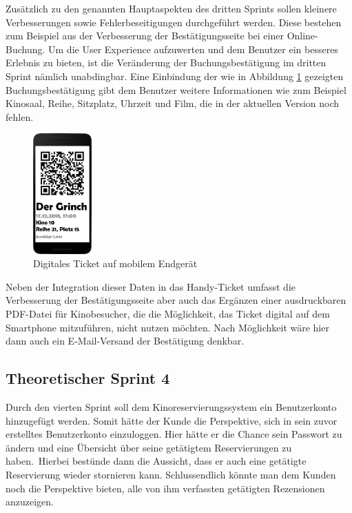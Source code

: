 Zusätzlich zu den genannten Hauptaspekten des dritten Sprints sollen kleinere Verbesserungen sowie Fehlerbeseitigungen durchgeführt werden.
Diese bestehen zum Beispiel aus der Verbesserung der Bestätigungsseite bei einer Online-Buchung.
Um die User Experience aufzuwerten und dem Benutzer ein besseres Erlebnis zu bieten, ist die Veränderung der Buchungsbestätigung im dritten Sprint nämlich unabdingbar.
Eine Einbindung der wie in Abbildung \ref{fig:ticket_phone} gezeigten Buchungsbestätigung gibt dem Benutzer weitere Informationen wie zum Beispiel Kinosaal, Reihe, Sitzplatz, Uhrzeit und Film, die in der aktuellen Version noch fehlen.

\begin{figure}[ht]
	\centering
	\includegraphics[width=0.2\textwidth]{img/ticket_phone}
	\captionsetup{format=hang}
	\caption{Digitales Ticket auf mobilem Endgerät}
	\label{fig:ticket_phone}
\end{figure}

Neben der Integration dieser Daten in das Handy-Ticket umfasst die Verbesserung der Bestätigungsseite aber auch das Ergänzen einer ausdruckbaren PDF-Datei für Kinobesucher, die die Möglichkeit, das Ticket digital auf dem Smartphone mitzuführen, nicht nutzen möchten.
Nach Möglichkeit wäre hier dann auch ein E-Mail-Versand der Bestätigung denkbar.

\subsection{Theoretischer Sprint 4}
\label{ssssec:sprint_benuterkonto}
\authorsection{\authorSG}
Durch den vierten Sprint soll dem Kinoreservierungssystem ein Benutzerkonto hinzugefügt werden.
Somit hätte der Kunde die Perspektive, sich in sein zuvor erstelltes Benutzerkonto einzuloggen.
Hier hätte er \ua die Chance sein Passwort zu ändern und eine Übersicht über seine getätigtem Reservierungen zu haben.\
Hierbei bestünde dann die Aussicht, dass er auch eine getätigte Reservierung wieder stornieren kann.
Schlussendlich könnte man dem Kunden noch die Perspektive bieten, alle von ihm verfassten getätigten Rezensionen anzuzeigen.

